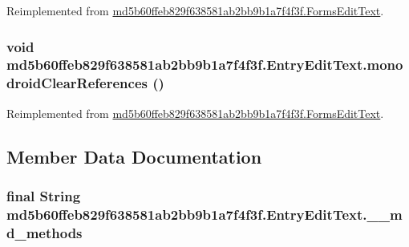 Reimplemented from \hyperlink{classmd5b60ffeb829f638581ab2bb9b1a7f4f3f_1_1_forms_edit_text_abff92edb59e12022a3bad902cad5b3c}{md5b60ffeb829f638581ab2bb9b1a7f4f3f.FormsEditText}.\hypertarget{classmd5b60ffeb829f638581ab2bb9b1a7f4f3f_1_1_entry_edit_text_788af3e6d9362437aec111b13b19f2c3}{
\subsubsection[{monodroidClearReferences}]{\setlength{\rightskip}{0pt plus 5cm}void md5b60ffeb829f638581ab2bb9b1a7f4f3f.EntryEditText.monodroidClearReferences ()}}
\label{classmd5b60ffeb829f638581ab2bb9b1a7f4f3f_1_1_entry_edit_text_788af3e6d9362437aec111b13b19f2c3}




Reimplemented from \hyperlink{classmd5b60ffeb829f638581ab2bb9b1a7f4f3f_1_1_forms_edit_text_842c9f28b9164b840f11c15e502397ff}{md5b60ffeb829f638581ab2bb9b1a7f4f3f.FormsEditText}.

\subsection{Member Data Documentation}
\hypertarget{classmd5b60ffeb829f638581ab2bb9b1a7f4f3f_1_1_entry_edit_text_2ad10bc93868a1a331ee5c3f0f6447b6}{
\subsubsection[{\_\-\_\-md\_\-methods}]{\setlength{\rightskip}{0pt plus 5cm}final String {\bf md5b60ffeb829f638581ab2bb9b1a7f4f3f.EntryEditText.\_\-\_\-md\_\-methods}}}
\label{classmd5b60ffeb829f638581ab2bb9b1a7f4f3f_1_1_entry_edit_text_2ad10bc93868a1a331ee5c3f0f6447b6}




